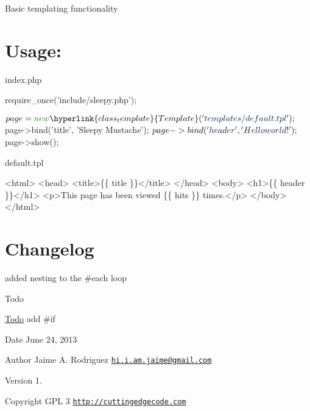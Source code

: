 Basic templating functionality\hypertarget{robo1_usage}{}\section{Usage\-:}\label{robo1_usage}
index.\-php 
\begin{DoxyCode}
require\_once(\textcolor{stringliteral}{'include/sleepy.php'});

$page = \textcolor{keyword}{new} \hyperlink{class_template}{Template}(\textcolor{stringliteral}{'templates/default.tpl'});
$page->bind(\textcolor{stringliteral}{'title'}, \textcolor{stringliteral}{'Sleepy Mustache'});
$page->bind(\textcolor{stringliteral}{'header'}, \textcolor{stringliteral}{'Hello world!'});
$page->show();
\end{DoxyCode}


default.\-tpl 
\begin{DoxyCode}
   <html>
   <head>
       <title>\{\{ title \}\}</title>
   </head>
   <body>
       <h1>\{\{ header \}\}</h1>
       <p>This page has been viewed \{\{ hits \}\} times.</p>
   </body>
</html>
\end{DoxyCode}
\hypertarget{mailer1_changelog}{}\section{Changelog}\label{mailer1_changelog}

\begin{DoxyItemize}
\item added nesting to the \#each loop
\end{DoxyItemize}

\begin{DoxyRefDesc}{Todo}
\item[\hyperlink{todo__todo000001}{Todo}]add \#if\end{DoxyRefDesc}


\begin{DoxyDate}{Date}
June 24, 2013 
\end{DoxyDate}
\begin{DoxyAuthor}{Author}
Jaime A. Rodriguez \href{mailto:hi.i.am.jaime@gmail.com}{\tt hi.\-i.\-am.\-jaime@gmail.\-com} 
\end{DoxyAuthor}
\begin{DoxyVersion}{Version}
1. 
\end{DoxyVersion}
\begin{DoxyCopyright}{Copyright}
G\-P\-L 3 \href{http://cuttingedgecode.com}{\tt http\-://cuttingedgecode.\-com} 
\end{DoxyCopyright}
